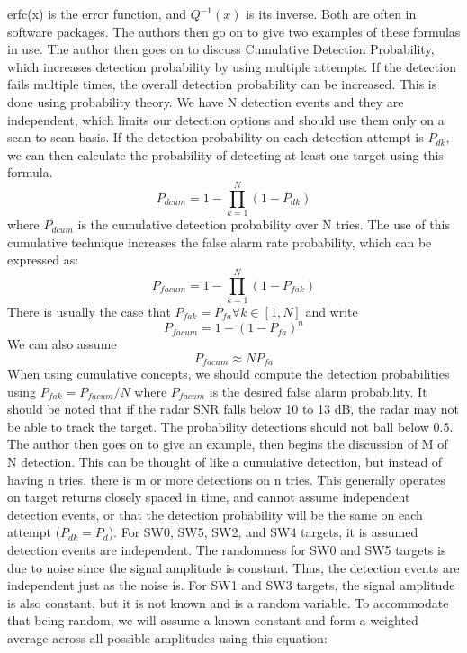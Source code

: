 \documentclass[12pt]{article}
\begin{document}
erfc(x) is the error function, and $Q^{-1}(x)$ is its inverse. Both are often in software packages. The authors then go on to give two examples of these formulas in use. The author then goes on to discuss Cumulative Detection Probability, which increases detection probability by using multiple attempts. If the detection fails multiple times, the overall detection probability can be increased. This is done using probability theory. We have N detection events and they are independent, which limits our detection options and should use them only on a scan to scan basis. If the detection probability on each detection attempt is $P_{dk}$, we can then calculate the probability of detecting at least one target using this formula.
\begin{equation}
    P_{dcum} = 1 - \prod_{k=1}^{N} \left( 1-P_{dk}\right)
\end{equation}
where $P_{dcum}$ is the cumulative detection probability over N tries. The use of this cumulative technique increases the false alarm rate probability, which can be expressed as:
\begin{equation}
    P_{facum} = 1 - \prod_{k=1}^{N} \left( 1-P_{fak}\right)
\end{equation}
There is usually the case that $P_{fak} = P_{fa} \forall k \in [1,N]$ and write
\begin{equation}
    P_{facum} = 1 - (1-P_{fa})^n
\end{equation}
We can also assume
\begin{equation}
    P_{facum} \approx NP_{fa}
\end{equation}
When using cumulative concepts, we should compute the detection probabilities using $P_{fak} = P_{facum}/N$ where $P_{facum}$ is the desired false alarm probability. It should be noted that if the radar SNR falls below 10 to 13 dB, the radar may not be able to track the target. The probability detections should not ball below 0.5. The author then goes on to give an example, then begins the discussion of M of N detection. This can be thought of like a cumulative detection, but instead of having n tries, there is m or more detections on n tries. This generally operates on target returns closely spaced in time, and cannot assume independent detection events, or that the detection probability will be the same on each attempt ($P_{dk} = P_d$). For SW0, SW5, SW2, and SW4 targets, it is assumed detection events are independent. The randomness for SW0 and SW5 targets is due to noise since the signal amplitude is constant. Thus, the detection events are independent just as the noise is. For SW1 and SW3 targets, the signal amplitude is also constant, but it is not known and is a random variable. To accommodate that being random, we will assume a known constant and form a weighted average across all possible amplitudes using this equation:
\end{document}
